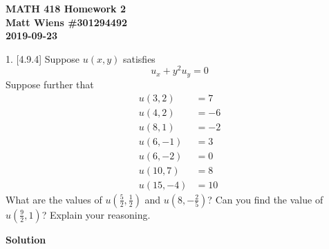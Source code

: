 \documentclass{article}
\begin{document}
\textbf{MATH 418 Homework 2} \\
\textbf{Matt Wiens \#301294492} \\
\textbf{2019-09-23}

1. [4.9.4] Suppose $u(x, y)$ satisfies
%
\begin{equation*}
    u_x+y^2 u_y = 0
\end{equation*}
%
Suppose further that
%
\begin{align*}
    u(3, 2) &= 7 \\
    u(4, 2) &= -6 \\
    u(8, 1) &= -2 \\
    u(6, -1) &= 3 \\
    u(6, -2) &= 0 \\
    u(10, 7) &= 8 \\
    u(15, -4) &= 10
\end{align*}
%
What are the values of $u\left(\frac{5}{2}, \frac{1}{2}\right)$ and
$u\left(8,-\frac{2}{5}\right)$? Can you find the value of
$u\left(\frac{9}{2},1\right)$? Explain your reasoning.

\textbf{Solution}
\end{document}
